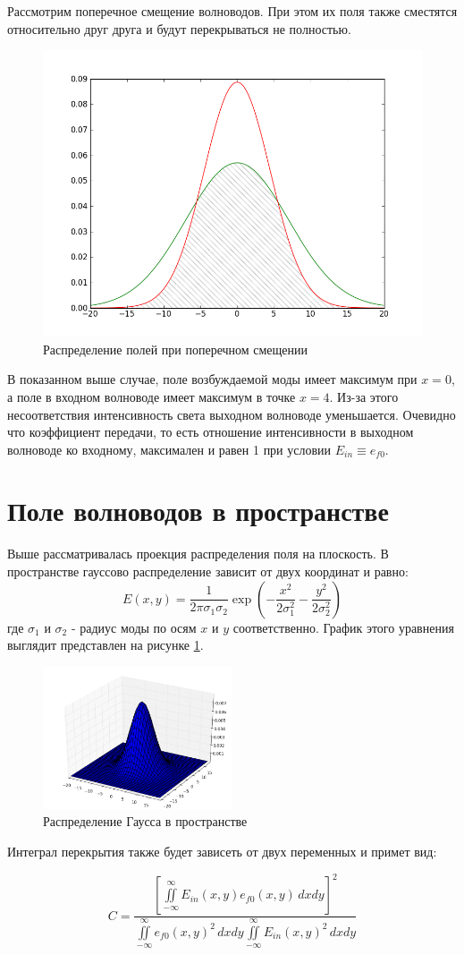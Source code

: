 Рассмотрим поперечное смещение волноводов. При этом их поля также сместятся относительно друг друга и будут перекрываться не полностью.

\begin{figure}[h!]
	\includegraphics[width=.5\textwidth]{img/intersection.png}
	\caption{Распределение полей при поперечном смещении}
\end{figure}

В показанном выше случае, поле возбуждаемой моды имеет максимум при $x=0$, а поле в входном волноводе имеет максимум в точке $x=4$. Из-за этого несоответствия интенсивность света выходном волноводе уменьшается. Очевидно что коэффициент передачи, то есть отношение интенсивности в выходном волноводе ко входному, максимален и равен 1 при условии $E_{in} \equiv e_{f0}$.

\section{Поле волноводов в пространстве}

Выше рассматривалась проекция распределения поля на плоскость. В пространстве гауссово распределение зависит от двух координат и равно:
\begin{equation}
  \label{gauss3d}
  E(x,y)=\frac{1}{2\pi\sigma_1\sigma_2}\exp\left(-\frac{x^2}{2\sigma_1^2}-\frac{y^2}{2\sigma_2^2}\right)
\end{equation}
где $\sigma_1$ и $\sigma_2$ - радиус моды по осям $x$ и $y$ соответственно. График этого уравнения выглядит представлен на рисунке \ref{gauss3dPlot}.
\begin{figure}[h!]
	\includegraphics[width=0.5\textwidth]{img/gauss3d.png}
	\caption{Распределение Гаусса в пространстве}
	\label{gauss3dPlot}
\end{figure}

Интеграл перекрытия также будет зависеть от двух переменных и примет вид:

\begin{equation}
	\label{coupling}
	C = \frac{\left[\iint\limits_{-\infty}^{\infty}E_{in}(x,y)e_{f0}(x,y) \,dxdy\right]^2}
	{\iint\limits_{-\infty}^{\infty}e_{f0}(x,y)^2 \,dxdy
	 \iint\limits_{-\infty}^{\infty}E_{in}(x,y)^2 \,dxdy}
\end{equation}
